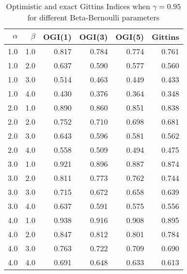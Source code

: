 \begin{table}
	\centering
	\begin{tabular}{rrrrrr}
		\toprule
		{}    $\alpha$ &   $\beta$ &  OGI(1) &  OGI(3) &  OGI(5) &  Gittins \\
		\midrule
		 1.0 & 1.0 &   0.817 &   0.784 &   0.774 &    0.761 \\
		 1.0 & 2.0 &   0.637 &   0.590 &   0.577 &    0.560 \\
		 1.0 & 3.0 &   0.514 &   0.463 &   0.449 &    0.433 \\
		 1.0 & 4.0 &   0.430 &   0.376 &   0.364 &    0.348 \\
		 2.0 & 1.0 &   0.890 &   0.860 &   0.851 &    0.838 \\
		 2.0 & 2.0 &   0.752 &   0.710 &   0.698 &    0.681 \\
		 2.0 & 3.0 &   0.643 &   0.596 &   0.581 &    0.562 \\
		2.0 & 4.0 &   0.558 &   0.509 &   0.494 &    0.475 \\
		 3.0 & 1.0 &   0.921 &   0.896 &   0.887 &    0.874 \\
		3.0 & 2.0 &   0.811 &   0.773 &   0.762 &    0.744 \\
		 3.0 & 3.0 &   0.715 &   0.672 &   0.658 &    0.639 \\
		 3.0 & 4.0 &   0.637 &   0.591 &   0.575 &    0.556 \\
		4.0 & 1.0 &   0.938 &   0.916 &   0.908 &    0.895 \\
		4.0 & 2.0 &   0.847 &   0.812 &   0.801 &    0.784 \\
		4.0 & 3.0 &   0.763 &   0.722 &   0.709 &    0.690 \\
		4.0 & 4.0 &   0.691 &   0.648 &   0.633 &    0.613 \\
		\bottomrule
	\end{tabular}
	\caption{Optimistic and exact Gittins Indices when $\gamma = 0.95$ for different Beta-Bernoulli parameters}
	\label{table:ogi_table_for_gamma_95}
\end{table}
